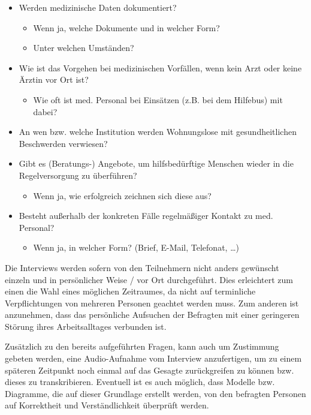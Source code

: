 \begin{itemize}
	\item Werden medizinische Daten dokumentiert?
	\begin{itemize}
		\item Wenn ja, welche Dokumente und in welcher Form?
		\item Unter welchen Umständen?
	\end{itemize}
	\item Wie ist das Vorgehen bei medizinischen Vorfällen, wenn kein Arzt oder keine Ärztin vor Ort ist?
	\begin{itemize}
		\item Wie oft ist med. Personal bei Einsätzen (z.B. bei dem Hilfebus) mit dabei?
	\end{itemize}
	\item An wen bzw. welche Institution werden Wohnungslose mit gesundheitlichen Beschwerden verwiesen?
	\item Gibt es (Beratungs-) Angebote, um hilfsbedürftige Menschen wieder in die Regelversorgung zu überführen?
	\begin{itemize}
		\item Wenn ja, wie erfolgreich zeichnen sich diese aus?
	\end{itemize}
	\item Besteht außerhalb der konkreten Fälle regelmäßiger Kontakt zu med. Personal?
	\begin{itemize}
		\item Wenn ja, in welcher Form? (Brief, E-Mail, Telefonat, …)
	\end{itemize}
\end{itemize}

Die Interviews werden sofern von den Teilnehmern nicht anders gewünscht einzeln und in persönlicher Weise / vor Ort durchgeführt. Dies erleichtert zum einen die Wahl eines möglichen Zeitraumes, da nicht auf terminliche Verpflichtungen von mehreren Personen geachtet werden muss. Zum anderen ist anzunehmen, dass das persönliche Aufsuchen der Befragten mit einer geringeren Störung ihres Arbeitsalltages verbunden ist.

Zusätzlich zu den bereits aufgeführten Fragen, kann auch um Zustimmung gebeten werden, eine Audio-Aufnahme vom Interview anzufertigen, um zu einem späteren Zeitpunkt noch einmal auf das Gesagte zurückgreifen zu können bzw. dieses zu transkribieren. Eventuell ist es auch möglich, dass Modelle bzw. Diagramme, die auf dieser Grundlage erstellt werden, von den befragten Personen auf Korrektheit und Verständlichkeit überprüft werden.



